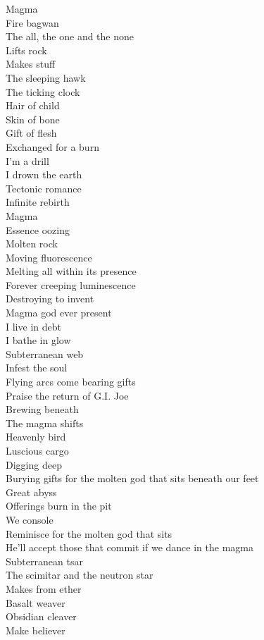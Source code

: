 Magma\\
Fire bagwan\\
The all, the one and the none\\
Lifts rock\\
Makes stuff\\
The sleeping hawk\\
The ticking clock\\
Hair of child\\
Skin of bone\\
Gift of flesh\\
Exchanged for a burn\\
I'm a drill\\
I drown the earth\\
Tectonic romance\\
Infinite rebirth\\
Magma\\
Essence oozing\\
Molten rock\\
Moving fluorescence\\
Melting all within its presence\\
Forever creeping luminescence\\
Destroying to invent\\
Magma god ever present\\
I live in debt\\
I bathe in glow\\
Subterranean web\\
Infest the soul\\
Flying arcs come bearing gifts\\
Praise the return of G.I. Joe\\
Brewing beneath\\
The magma shifts\\
Heavenly bird\\
Luscious cargo\\
Digging deep\\
Burying gifts for the molten god that sits beneath our feet\\
Great abyss\\
Offerings burn in the pit\\
We console\\
Reminisce for the molten god that sits\\
He'll accept those that commit if we dance in the magma\\
Subterranean tsar\\
The scimitar and the neutron star\\
Makes from ether\\
Basalt weaver\\
Obsidian cleaver\\
Make believer\\

